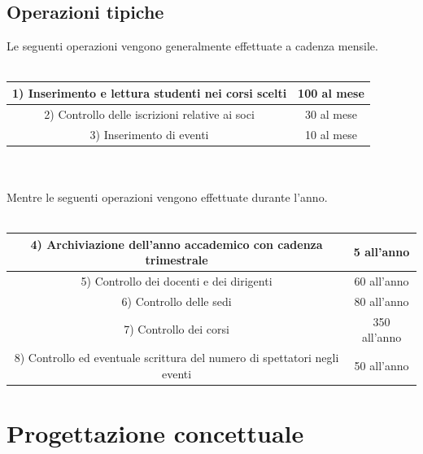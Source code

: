 \documentclass[11pt]{article}
\begin{document}
	\subsection{Operazioni tipiche}
		Le seguenti operazioni vengono generalmente effettuate a cadenza mensile.\\\\
		\begin{tabular}{|c|c|}
			\hline
			1) Inserimento e lettura studenti nei corsi scelti & 100 al mese\\
			\hline
			2) Controllo delle iscrizioni relative ai soci & 30 al mese\\
			\hline
			3) Inserimento di eventi & 10 al mese\\
			\hline
		\end{tabular}
		\\\\
		Mentre le seguenti operazioni vengono effettuate durante l'anno.\\\\
		\begin{tabular}{|c|c|}
			\hline
			4) Archiviazione dell'anno accademico con cadenza trimestrale& 5 all'anno\\
			\hline
			5) Controllo dei docenti e dei dirigenti & 60 all'anno\\
			\hline
			6) Controllo delle sedi & 80 all'anno\\
			\hline
			7) Controllo dei corsi & 350 all'anno\\
			\hline
			8) Controllo ed eventuale scrittura del numero di spettatori negli eventi & 50 all'anno\\
			\hline
		\end{tabular}
\section{Progettazione concettuale}
\end{document}
